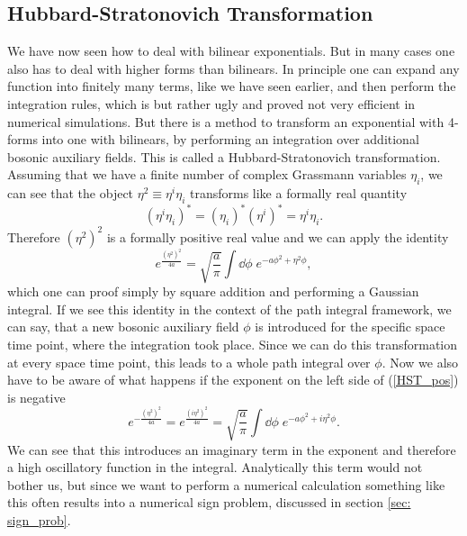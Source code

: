 \subsection{Hubbard-Stratonovich Transformation} \label{sec: HS_trafo}
We have now seen how to deal with bilinear exponentials. But in many cases one also has to deal with higher forms than bilinears. In principle one can expand any function into finitely many terms, like we have seen earlier, and then perform the integration rules, which is but rather ugly and proved not very efficient in numerical simulations. But there is a method to transform an exponential with 4-forms into one with bilinears, by performing an integration over additional bosonic auxiliary fields. This is called a Hubbard-Stratonovich transformation. Assuming that we have a finite number of complex Grassmann variables $\eta_{i}$, we can see that the object $\eta^{2}\equiv \eta^{i}\eta_{i}$ transforms like a formally real quantity
\begin{equation}
\left(\eta^{i}\eta_{i}\right)^{\ast}=\left(\eta_{i}\right)^{\ast}\left(\eta^{i}\right)^{\ast} =\eta^{i}\eta_{i}.
\end{equation}
Therefore $\left(\eta^{2}\right)^{2}$ is a formally positive real value and we can apply the identity
\begin{equation}
e ^{\frac{(\eta^{2})^{2}}{4a}}=\sqrt{\frac{a}{\pi}} \int\dd\phi\;e ^{-a\phi^{2}+\eta^{2}\phi},
\label{HST_pos}
\end{equation}
which one can proof simply by square addition and performing a Gaussian integral. If we see this identity in the context of the path integral  framework, we can say, that a new bosonic auxiliary field $\phi$ is introduced for the specific space time point, where the integration took place. Since we can do this transformation at every space time point, this leads to a whole path integral  over $\phi$. Now we also have to be aware of what happens if the exponent on the left side of (\ref{HST_pos}) is negative
\begin{equation}
e ^{-\frac{(\eta^{2})^{2}}{4a}}=e ^{\frac{(i\eta^{2})^{2}}{4a}}=\sqrt{\frac{a}{\pi}} \int\dd\phi\; e ^{-a\phi^{2}+i\eta^{2}\phi}.
\end{equation}
We can see that this introduces an imaginary term in the exponent and therefore a high oscillatory function in the integral. Analytically this term would not bother us, but since we want to perform a numerical calculation something like this often results into a numerical sign problem, discussed in section \ref{sec: sign_prob}.

